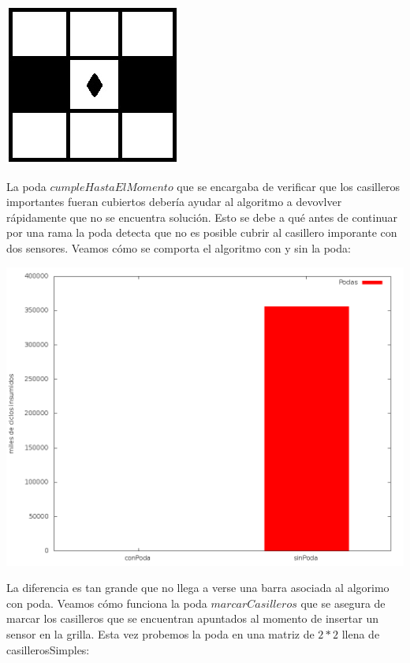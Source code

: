 \includegraphics[scale=0.5]{ej3/imgs/ejSinSolucion.png}

La poda $cumpleHastaElMomento$ que se encargaba de verificar que los casilleros importantes fueran cubiertos debería ayudar al algoritmo a devovlver rápidamente que no se encuentra solución. Esto se debe a qué antes de continuar por una rama la poda detecta que no es posible cubrir al casillero imporante con dos sensores. Veamos cómo se comporta el algoritmo con y sin la poda:

\includegraphics[scale=0.2]{ej3/imgs/cumpleHastaElMomento.png}

La diferencia es tan grande que no llega a verse una barra asociada al algorimo con poda. Veamos cómo funciona la poda $marcarCasilleros$ que se asegura de marcar los casilleros que se encuentran apuntados al momento de insertar un sensor en la grilla. Esta vez probemos la poda en una matriz de $2*2$ llena de casillerosSimples:

